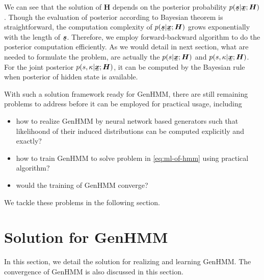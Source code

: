 \documentclass[letterpaper]{article} %
\newcommand{\ubar}[1]{\mkern2mu\underline{\mkern-2mu #1\mkern-2mu}\mkern2mu}
\newcommand{\ubm}[1]{\ubar{\bm{#1}}}
\begin{document}
We can see that the solution of $\bm{H}$ depends on the posterior probability $p(\ubm{s}| \ubm{x}; \bm{H})$. Though the evaluation of posterior according to Bayesian theorem is straightforward, the computation complexity of $p(\ubm{s}| \ubm{x}; \bm{H})$ grows exponentially with the length of $\ubm{s}$. Therefore, we employ forward-backward algorithm \cite{Bishop:2006:PRM:1162264} to do the posterior computation efficiently. As we would detail in next section, what are needed to formulate the problem, are actually the $p(s| \ubm{x}; \bm{H})$ and $p(s, \kappa| \ubm{x}; \bm{H})$. For the joint posterior $p(s, \kappa| \ubm{x}; \bm{H})$, it can be computed by the Bayesian rule when posterior of hidden state is available.


With such a solution framework ready for GenHMM, there are still remaining problems to address before it can be employed for practical usage, including
\begin{itemize}
\item how to realize GenHMM by neural network based generators such that likelihoond of their induced distributions can be computed explicitly and exactly?
\item how to train GenHMM to solve problem in \eqref{eq:ml-of-hmm} using practical algorithm?
\item would the training of GenHMM converge?
\end{itemize}
We tackle these problems in the following section.



\section{Solution for GenHMM}

In this section, we detail the solution for realizing and learning GenHMM. %
The convergence of GenHMM is also discussed in this section.
\end{document}
